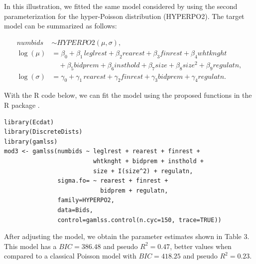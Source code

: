 In this illustration, we fitted the same model considered by \citet{Saez13} using the second parameterization for the hyper-Poisson distribution (HYPERPO2). The target model can be summarized as follows:

\begin{equation}
\begin{split}
numbids &\sim HYPERPO2(\mu, \sigma), \\
        \log(\mu) &=\beta_0 + \beta_1 \, leglrest + \beta_2 rearest + \beta_3 finrest + \beta_4 whtknght \\ 
     & \quad + \beta_5 bidprem + \beta_6 insthold + \beta_7 size + \beta_8 size^2 + \beta_9 regulatn ,  \\
\log(\sigma) &= \gamma_0 + \gamma_1 \, rearest + \gamma_2 finrest + \gamma_3 bidprem + \gamma_4 regulatn.
\end{split}
\label{eq:modbids01} 
\end{equation}

With the R code below, we can fit the model using the proposed functions in the  R package \citep{DiscreteDists_pack}.

\begin{verbatim}
library(Ecdat)
library(DiscreteDists)
library(gamlss)
mod3 <- gamlss(numbids ~ leglrest + rearest + finrest + 
                         whtknght + bidprem + insthold + 
                         size + I(size^2) + regulatn,
               sigma.fo= ~ rearest + finrest + 
                           bidprem + regulatn,
               family=HYPERPO2, 
               data=Bids,
               control=gamlss.control(n.cyc=150, trace=TRUE))
\end{verbatim}

After adjusting the model, we obtain the parameter estimates shown in Table 3. This model has a \(BIC=386.48\) and pseudo \(R^2=0.47\), better values when compared to a classical Poisson model with \(BIC=418.25\) and pseudo \(R^2=0.23\).

